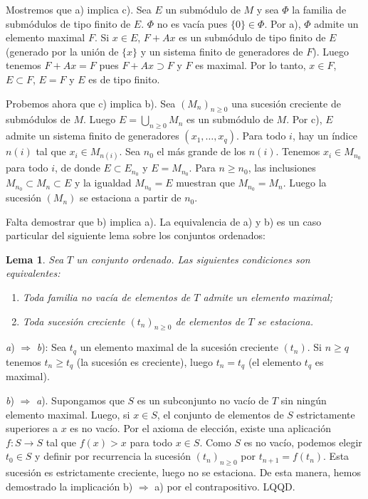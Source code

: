 \documentclass[bibtotoc,leqno,spanish]{amsbook}
\newcommand{\QED}{LQQD.}
\newcommand{\then}{\ensuremath{\Rightarrow}\xspace}
\renewcommand{\to}[1][]{\xrightarrow{#1}}
\numberwithin{equation}{section}
\theoremstyle{note}
\theoremstyle{note}
\newtheorem{lemma}{Lema}
\theoremstyle{rem}
\numberwithin{theorem}{section}
\numberwithin{proposition}{section}
\numberwithin{definition}{section}
\numberwithin{lemma}{section}
\numberwithin{corollary}{section}
\numberwithin{example}{section}
\numberwithin{footnote}{section}%
\begin{document}
Mostremos que a) implica c). Sea $E$ un subm\'odulo de $M$ y
sea $\Phi$ la familia de subm\'odulos de tipo finito de $E$.
$\Phi$ no es vac\'ia pues $\{0\}\in\Phi$. Por a), $\Phi$ admite
un elemento maximal $F$. Si $x\in E$, $F+Ax$ es un subm\'odulo
de tipo finito de $E$ (generado por la uni\'on de $\{x\}$ y
un sistema finito de generadores de $F$). Luego tenemos
$F+Ax = F$ pues $F+Ax\supset F$ y $F$ es maximal. Por lo tanto,
$x\in F$, $E\subset F$, $E = F$ y $E$ es de tipo finito.

Probemos ahora que c) implica b). Sea $(M_{n})_{n\geq 0}$
una sucesi\'on creciente de subm\'odulos de $M$. Luego
$E = \bigcup_{n\geq 0}M_{n}$ es un subm\'odulo de $M$.
Por c), $E$ admite un sistema finito de generadores
$(x_{1},\dots,x_{q})$. Para todo $i$, hay un \'indice
$n(i)$ tal que $x_{i}\in M_{n(i)}$. Sea $n_{0}$ el m\'as
grande de los $n(i)$. Tenemos $x_{i}\in M_{n_{0}}$ para todo
$i$, de donde $E\subset E_{n_{0}}$ y $E = M_{n_{0}}$. Para
$n\geq n_{0}$, las inclusiones $M_{n_{0}}\subset M_{n}
\subset E$ y la igualdad $M_{n_{0}} = E$ muestran que
$M_{n_{0}} = M_{n}$. Luego la sucesi\'on $(M_{n})$ se
estaciona a partir de $n_{0}$.

Falta demostrar que b) implica a). La equivalencia
de a) y b) es un caso particular del siguiente lema sobre
los conjuntos ordenados:

\begin{lemma}
Sea $T$ un conjunto ordenado. Las siguientes condiciones son
equivalentes:
\begin{enumerate}
\item[a)] Toda familia no vac\'ia de elementos de $T$ admite un
elemento maximal;
\item[b)] Toda sucesi\'on creciente $(t_{n})_{n\geq 0}$ de
elementos de $T$ se estaciona.
\end{enumerate}
\end{lemma}

{\itshape a}) \then{ \itshape b}): Sea $t_{q}$ un elemento maximal de la sucesi\'on
creciente $(t_{n})$. Si $n\geq q$ tenemos $t_{n}\geq t_{q}$
(la sucesi\'on es creciente), luego $t_{n} = t_{q}$ (el elemento
$t_{q}$ es maximal).

{\itshape b}) \then{ \itshape a}). Supongamos que $S$ es un subconjunto no vac\'io
de $T$ sin ning\'un elemento maximal. Luego, si $x\in S$, el conjunto
de elementos de $S$ estrictamente superiores a $x$ es no
vac\'io. Por el axioma de elecci\'on, existe una aplicaci\'on
$f:S\to S$ tal que $f(x) > x$ para todo $x\in S$. Como $S$ es
no vac\'io, podemos elegir $t_{0}\in S$ y definir por recurrencia
la sucesi\'on $(t_{n})_{n\geq 0}$ por $t_{n+1}=f(t_{n})$.
Esta sucesi\'on es estrictamente creciente, luego no se estaciona.
De esta manera, hemos demostrado la implicaci\'on b) \then a)
por el contrapositivo. \QED
\end{document}
